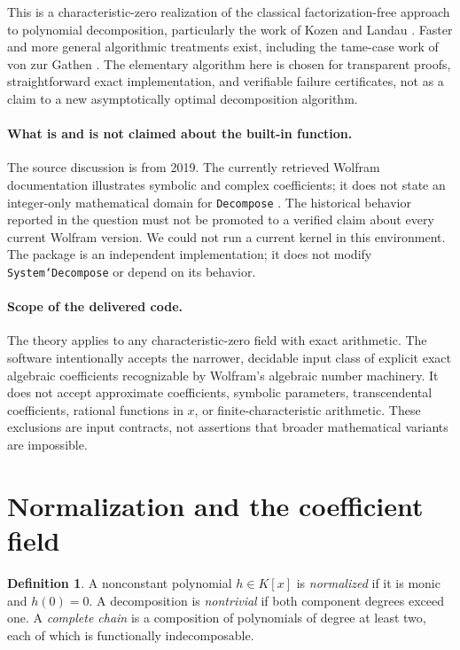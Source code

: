 \documentclass[11pt,a4paper]{article}
\numberwithin{equation}{section}
\theoremstyle{definition}
\newtheorem{definition}[theorem]{Definition}
\theoremstyle{remark}
\newcommand{\code}[1]{\texttt{#1}}
\begin{document}
This is a characteristic-zero realization of the classical factorization-free
approach to polynomial decomposition, particularly the work of Kozen and
Landau \cite{KL}. Faster and more general algorithmic treatments exist,
including the tame-case work of von zur Gathen \cite{Gathen}. The elementary
algorithm here is chosen for transparent proofs, straightforward exact
implementation, and verifiable failure certificates, not as a claim to a new
asymptotically optimal decomposition algorithm.

\paragraph{What is and is not claimed about the built-in function.}
The source discussion is from 2019. The currently retrieved Wolfram
documentation illustrates symbolic and complex coefficients; it does not
state an integer-only mathematical domain for \code{Decompose} \cite{Decompose}.
The historical behavior reported in the question must not be promoted to a
verified claim about every current Wolfram version. We could not run a current
kernel in this environment. The package is an independent implementation;
it does not modify \code{System`Decompose} or depend on its behavior.

\paragraph{Scope of the delivered code.}
The theory applies to any characteristic-zero field with exact arithmetic.
The software intentionally accepts the narrower, decidable input class of
explicit exact algebraic coefficients recognizable by Wolfram's algebraic
number machinery. It does not accept approximate coefficients, symbolic
parameters, transcendental coefficients, rational functions in $x$, or
finite-characteristic arithmetic. These exclusions are input contracts,
not assertions that broader mathematical variants are impossible.

\section{Normalization and the coefficient field}
\label{sec:normalization}
\begin{definition}
A nonconstant polynomial $h\in K[x]$ is \emph{normalized} if it is monic and
$h(0)=0$. A decomposition is \emph{nontrivial} if both component degrees exceed
one. A \emph{complete chain} is a composition of polynomials of degree at
least two, each of which is functionally indecomposable.
\end{definition}
\end{document}
